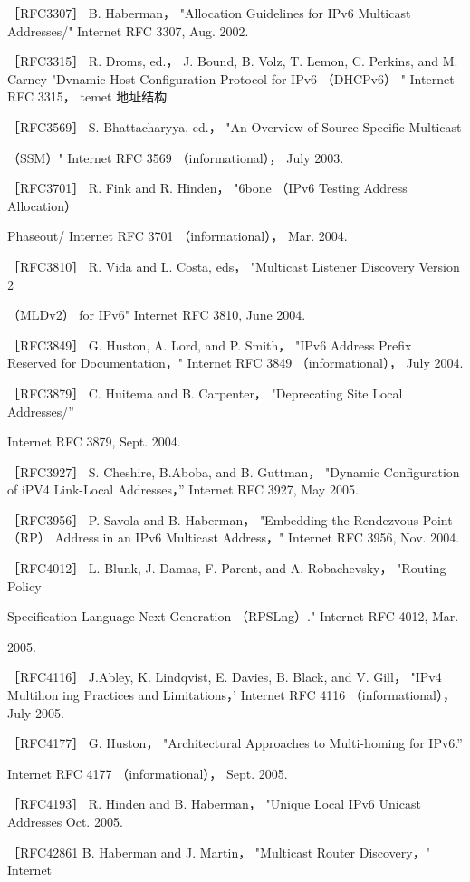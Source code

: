 ［RFC3307］ B. Haberman， "Allocation Guidelines for IPv6 Multicast Addresses/"
Internet RFC 3307, Aug. 2002.

［RFC3315］ R. Droms, ed.， J. Bound, B. Volz, T. Lemon, C. Perkins, and M. Carney
"Dvnamic Host Configuration Protocol for IPv6 （DHCPv6） " Internet RFC 3315，
temet 地址结构

［RFC3569］ S. Bhattacharyya, ed.， "An Overview of Source-Specific Multicast

（SSM）" Internet RFC 3569 （informational）， July 2003.

［RFC3701］ R. Fink and R. Hinden， "6bone （IPv6 Testing Address Allocation）

Phaseout/ Internet RFC 3701 （informational）， Mar. 2004.

［RFC3810］ R. Vida and L. Costa, eds， "Multicast Listener Discovery Version 2

（MLDv2） for IPv6" Internet RFC 3810, June 2004.

［RFC3849］ G. Huston, A. Lord, and P. Smith， "IPv6 Address Prefix Reserved for
Documentation，" Internet RFC 3849 （informational）， July 2004.

［RFC3879］ C. Huitema and B. Carpenter， "Deprecating Site Local Addresses/”

Internet RFC 3879, Sept. 2004.

［RFC3927］ S. Cheshire, B.Aboba, and B. Guttman， "Dynamic Configuration of
iPV4 Link-Local Addresses，” Internet RFC 3927, May 2005.

［RFC3956］ P. Savola and B. Haberman， "Embedding the Rendezvous Point （RP）
Address in an IPv6 Multicast Address，" Internet RFC 3956, Nov. 2004.

［RFC4012］ L. Blunk, J. Damas, F. Parent, and A. Robachevsky， "Routing Policy

Specification Language Next Generation （RPSLng）." Internet RFC 4012, Mar.

2005.

［RFC4116］ J.Abley, K. Lindqvist, E. Davies, B. Black, and V. Gill， "IPv4 Multihon
ing Practices and Limitations，' Internet RFC 4116 （informational）， July 2005.

［RFC4177］ G. Huston， "Architectural Approaches to Multi-homing for IPv6.”

Internet RFC 4177 （informational）， Sept. 2005.

［RFC4193］ R. Hinden and B. Haberman， "Unique Local IPv6 Unicast Addresses
Oct. 2005.

［RFC42861 B. Haberman and J. Martin， "Multicast Router Discovery，" Internet


